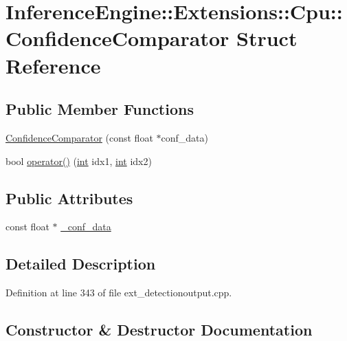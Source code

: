 \hypertarget{structInferenceEngine_1_1Extensions_1_1Cpu_1_1ConfidenceComparator}{}\section{Inference\+Engine\+:\+:Extensions\+:\+:Cpu\+:\+:Confidence\+Comparator Struct Reference}
\label{structInferenceEngine_1_1Extensions_1_1Cpu_1_1ConfidenceComparator}
\subsection*{Public Member Functions}
\begin{DoxyCompactItemize}
\item 
\hyperlink{structInferenceEngine_1_1Extensions_1_1Cpu_1_1ConfidenceComparator_a6a64fe84a0a07453cfdfbcbd935e0c05}{Confidence\+Comparator} (const float $\ast$conf\+\_\+data)
\item 
bool \hyperlink{structInferenceEngine_1_1Extensions_1_1Cpu_1_1ConfidenceComparator_a667aec658d4b9b1a1b52672efc46ada8}{operator()} (\hyperlink{CMakeCache_8txt_a79a3d8790b2588b09777910863574e09}{int} idx1, \hyperlink{CMakeCache_8txt_a79a3d8790b2588b09777910863574e09}{int} idx2)
\end{DoxyCompactItemize}
\subsection*{Public Attributes}
\begin{DoxyCompactItemize}
\item 
const float $\ast$ \hyperlink{structInferenceEngine_1_1Extensions_1_1Cpu_1_1ConfidenceComparator_a4799b1ce7bed1246a75811fdf76205c6}{\+\_\+conf\+\_\+data}
\end{DoxyCompactItemize}


\subsection{Detailed Description}


Definition at line 343 of file ext\+\_\+detectionoutput.\+cpp.



\subsection{Constructor \& Destructor Documentation}
